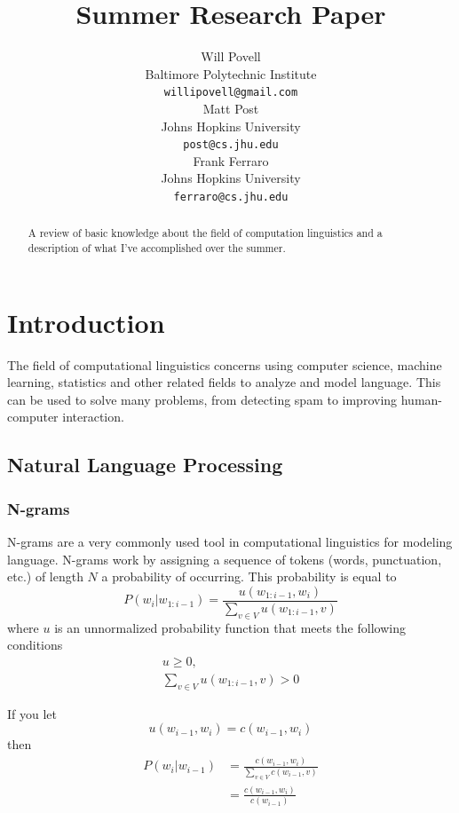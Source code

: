 \documentclass[11pt]{article}
\title{Summer Research Paper}
\author{Will Povell \\
  Baltimore Polytechnic Institute \\
  {\tt willipovell@gmail.com} \\\And
  Matt Post \\
  Johns Hopkins University \\
  {\tt post@cs.jhu.edu} \\\And
  Frank Ferraro \\
  Johns Hopkins University \\
  {\tt ferraro@cs.jhu.edu}}
\date{}
\begin{document}
\maketitle

\begin{abstract}
  A review of basic knowledge about the field of computation linguistics and a description of what I've accomplished over the summer.
\end{abstract}

\section{Introduction}

The field of computational linguistics concerns using computer science, machine learning, statistics and other related fields to analyze and model language. This can be used to solve many problems, from detecting spam to improving human-computer interaction.

\subsection{Natural Language Processing}

\subsubsection{N-grams}

N-grams are a very commonly used tool in computational linguistics for modeling language. N-grams work by assigning a sequence of tokens (words, punctuation, etc.) of length $N$ a probability of occurring. This probability is equal to
$$ P\left(w_i | w_{1:i-1}\right) = \frac{u\left(w_{1:i-1}, w_i\right)}{\sum\limits_{v \in V} u\left(w_{1:i-1}, v\right)} $$
where $u$ is an unnormalized probability function that meets the following conditions
\begin{gather*}
u \geq 0, \\
\sum\limits_{v \in V} u\left(w_{1:i-1}, v\right) > 0
\end{gather*}

If you let
$$ u\left(w_{i-1}, w_i\right) = c\left(w_{i-1}, w_i\right) $$
then
\begin{align*}
P\left(w_i \vert w_{i-1} \right) &= \frac{ c\left( w_{i-1}, w_i \right) }{ \sum\limits_{v \in V} c\left( w_{i-1}, v \right)} \\
&= \frac{ c\left( w_{i-1}, w_i \right) }{c\left( w_{i-1} \right) }
\end{align*}
\end{document}
